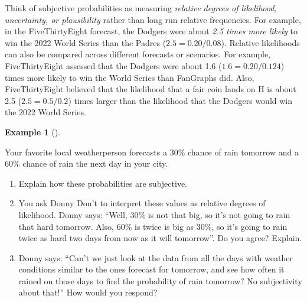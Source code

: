 \documentclass[
  letterpaper,
  DIV=11,
  numbers=noendperiod]{scrreprt}
\providecommand{\tightlist}{%
  \setlength{\itemsep}{0pt}\setlength{\parskip}{0pt}}
\theoremstyle{plain}
\theoremstyle{definition}
\newtheorem{example}{Example}[chapter]
\theoremstyle{definition}
\theoremstyle{definition}
\theoremstyle{remark}
\begin{document}
Think of subjective probabilities as measuring \emph{relative degrees of
likelihood, uncertainty, or plausibility} rather than long run relative
frequencies. For example, in the FiveThirtyEight forecast, the Dodgers
were about \emph{2.5 times more likely} to win the 2022 World Series
than the Padres (\(2.5 = 0.20 / 0.08\)). Relative likelihoods can also
be compared across different forecasts or scenarios. For example,
FiveThirtyEight assessed that the Dodgers were about 1.6
(\(1.6 = 0.20 / 0.124\)) times more likely to win the World Series than
FanGraphs did. Also, FiveThirtyEight believed that the likelihood that a
fair coin lands on H is about 2.5 (\(2.5 = 0.5 / 0.2\)) times larger
than the likelihood that the Dodgers would win the 2022 World Series.

\begin{tcolorbox}[enhanced jigsaw, opacityback=0, left=2mm, colframe=quarto-callout-note-color-frame, toprule=.15mm, breakable, colback=white, leftrule=.75mm, arc=.35mm, rightrule=.15mm, bottomrule=.15mm]

\begin{example}[]\protect\hypertarget{exm-donny-weather-subjective}{}\label{exm-donny-weather-subjective}

Your favorite local weatherperson forecasts a 30\% chance of rain
tomorrow and a 60\% chance of rain the next day in your city.

\begin{enumerate}
\def\labelenumi{\arabic{enumi}.}
\tightlist
\item
  Explain how these probabilities are subjective.
\item
  You ask Donny Don't to interpret these values as relative degrees of
  likelihood. Donny says: ``Well, 30\% is not that big, so it's not
  going to rain that hard tomorrow. Also, 60\% is twice is big as 30\%,
  so it's going to rain twice as hard two days from now as it will
  tomorrow''. Do you agree? Explain.
\item
  Donny says: ``Can't we just look at the data from all the days with
  weather conditions similar to the ones forecast for tomorrow, and see
  how often it rained on those days to find the probability of rain
  tomorrow? No subjectivity about that!'' How would you respond?\\
\end{enumerate}

\end{example}

\end{tcolorbox}
\end{document}
